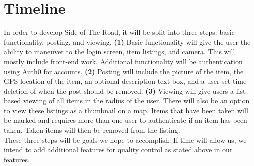 \documentclass[sigconf]{acmart}
\begin{document}
\section{Timeline}
In order to develop Side of The Road, it will be split into three steps: basic functionality, posting, and viewing.
\textbf{(1)} Basic functionality will give the user the ability to maneuver to the login screen, item listings, and camera. This will mostly include front-end work. Additional functionality will be authentication using Auth0 for accounts.
\textbf{(2)} Posting will include the picture of the item, the GPS location of the item, an optional description text box, and a user set time-deletion of when the post should be removed. 
\textbf{(3)} Viewing will give users a list-based viewing of all items in the radius of the user. There will also be an option to view these listings as a thumbnail on a map. Items that have been taken will be marked and requires more than one user to authenticate if an item has been taken. Taken items will then be removed from the listing. \\

\noindent
These three steps will be goals we hope to accomplish. If time will allow us, we intend to add additional features for quality control as stated above in our features.
\end{document}
